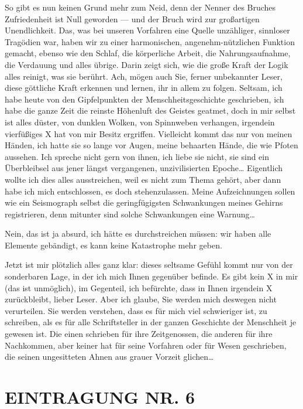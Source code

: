 So gibt es nun keinen Grund mehr zum Neid, denn der Nenner des
Bruches Zufriedenheit ist Null geworden — und der Bruch wird zur
großartigen Unendlichkeit. Das, was bei unseren Vorfahren eine
Quelle unzähliger, sinnloser Tragödien war, haben wir zu einer
harmonischen, angenehm-nützlichen Funktion gemacht, ebenso wie den
Schlaf, die körperliche Arbeit, die Nahrungsaufnahme, die Verdauung
und alles übrige. Darin zeigt sich, wie die große Kraft der Logik
alles reinigt, was sie berührt. Ach, mögen auch Sie, ferner
unbekannter Leser, diese göttliche Kraft erkennen und lernen, ihr
in allem zu folgen. Seltsam, ich habe heute von den Gipfelpunkten
der Menschheitsgeschichte geschrieben, ich habe die ganze Zeit die
reinste Höhenluft des Geistes geatmet, doch in mir selbst ist alles
düster, von dunklen Wolken, von Spinnweben verhangen, irgendein
vierfüßiges X hat von mir Besitz ergriffen. Vielleicht kommt das
nur von meinen Händen, ich hatte sie so lange vor Augen, meine
behaarten Hände, die wie Pfoten aussehen. Ich spreche nicht gern
von ihnen, ich liebe sie nicht, sie sind ein Überbleibsel aus jener
längst vergangenen, unzivilisierten Epoche\ldots{} Eigentlich wollte ich
dies alles ausstreichen, weil es nicht zum Thema gehört, aber dann
habe ich mich entschlossen, es doch stehenzulassen. Meine
Aufzeichnungen sollen wie ein Seismograph selbst die
geringfügigsten Schwankungen meines Gehirns registrieren, denn
mitunter sind solche Schwankungen eine Warnung\ldots{}

Nein, das ist ja absurd, ich hätte es durchstreichen müssen: wir
haben alle Elemente gebändigt, es kann keine Katastrophe mehr
geben.

Jetzt ist mir plötzlich alles ganz klar: dieses seltsame Gefühl
kommt nur von der sonderbaren Lage, in der ich mich Ihnen gegenüber
befinde. Es gibt kein X in mir (das ist unmöglich), im Gegenteil,
ich befürchte, dass in Ihnen irgendein X zurückbleibt, lieber
Leser. Aber ich glaube, Sie werden mich deswegen nicht verurteilen.
Sie werden verstehen, dass es für mich viel schwieriger ist, zu
schreiben, als es für alle Schriftsteller in der ganzen Geschichte
der Menschheit je gewesen ist. Die einen schrieben für ihre
Zeitgenossen, die anderen für ihre Nachkommen, aber keiner hat für
seine Vorfahren oder für Wesen geschrieben, die seinen ungesitteten
Ahnen aus grauer Vorzeit glichen\ldots{}

\section{EINTRAGUNG NR. 6}

